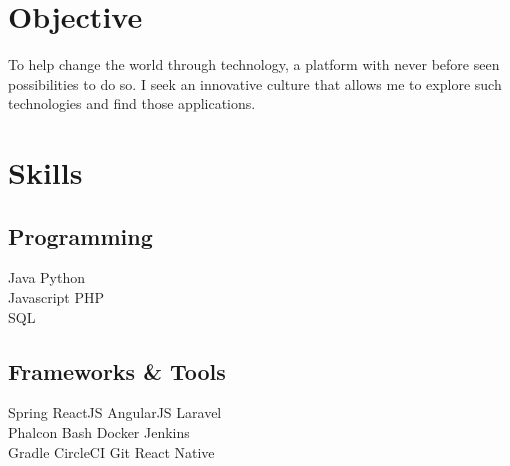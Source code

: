 \documentclass[]{resume}
\begin{document}
%
%


%
%


%
%

\begin{minipage}[t]{0.33\textwidth}


\section{Objective}
\begin{minipage}[t]{0.90\textwidth}
To help change the world through technology, a platform with never before seen possibilities to do so. I seek an innovative culture that allows me to explore such technologies and find those applications.
\end{minipage}
\sectionsep


\section{Skills}
\subsection{Programming}
Java \textbullet{} Python \\
Javascript \textbullet{} PHP \\
SQL \\
\sectionsep

\subsection{Frameworks \& Tools}
Spring \textbullet{}  ReactJS  \textbullet{}  AngularJS \textbullet{}  Laravel \\
Phalcon \textbullet{} Bash \textbullet{} Docker \textbullet{} Jenkins \\ 
Gradle \textbullet{} CircleCI \textbullet{} Git \textbullet{}  React Native \\
\sectionsep


\end{minipage}
\end{document}
